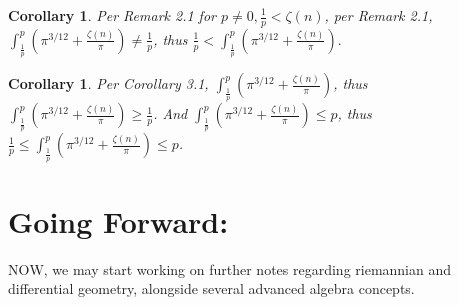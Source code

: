 \documentclass[10pt]{article}
\theoremstyle{plain}
\newtheorem{corollary}[theorem]{Corollary}
\theoremstyle{definition}
\theoremstyle{remark}
\begin{document}
\begin{corollary}
	Per Remark 2.1 for $p \neq 0, \frac{1}{p} < \zeta(n)$, per Remark 2.1, $\int_{\frac{1}{p}}^{p} (\pi^{3/12} + \frac{\zeta(n)}{\pi}) \neq \frac{1}{p}$, thus $\frac{1}{p} < \int_{\frac{1}{p}}^{p} (\pi^{3/12} + \frac{\zeta(n)}{\pi}).$
\end{corollary}

\begin{corollary}
	Per Corollary 3.1, $\int_{\frac{1}{p}}^{p} (\pi^{3/12} + \frac{\zeta(n)}{\pi})$, thus $\int_{\frac{1}{p}}^{p} (\pi^{3/12} + \frac{\zeta(n)}{\pi}) \geq \frac{1}{p}$. And $\int_{\frac{1}{p}}^{p} (\pi^{3/12} + \frac{\zeta(n)}{\pi}) \leq p$, thus $\frac{1}{p} \leq \int_{\frac{1}{p}}^{p} (\pi^{3/12} + \frac{\zeta(n)}{\pi}) \leq p$.
\end{corollary}

\section{Going Forward:}

\lettrine[lines=1, lhang=0.1, loversize=0.2]{N}OW, we may start working on further notes regarding riemannian and differential geometry, alongside several advanced algebra concepts.

\nocite{*}




\end{document}
